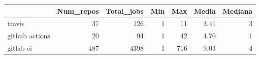 \begin{tabular}{lrrrrrr}
\toprule
{} &  Num\_repos &  Total\_jobs &  Min &  Max &  Media &  Mediana \\
\midrule
travis         &         37 &         126 &    1 &   11 &   3.41 &        3 \\
github actions &         20 &          94 &    1 &   42 &   4.70 &        1 \\
gitlab ci      &        487 &        4398 &    1 &  716 &   9.03 &        4 \\
\bottomrule
\end{tabular}
